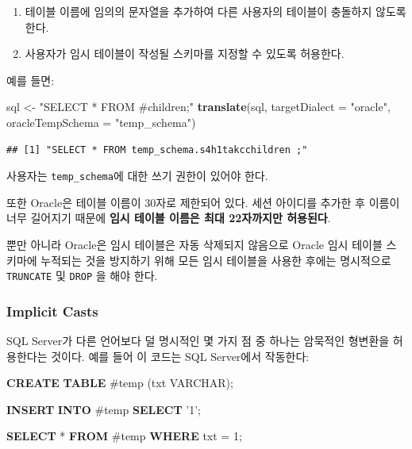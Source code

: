 \documentclass[11pt]{book}
\newenvironment{Shaded}{\begin{snugshade}}{\end{snugshade}}
\newcommand{\KeywordTok}[1]{\textcolor[rgb]{0.13,0.29,0.53}{\textbf{#1}}}
\newcommand{\DataTypeTok}[1]{\textcolor[rgb]{0.13,0.29,0.53}{#1}}
\newcommand{\DecValTok}[1]{\textcolor[rgb]{0.00,0.00,0.81}{#1}}
\newcommand{\StringTok}[1]{\textcolor[rgb]{0.31,0.60,0.02}{#1}}
\newcommand{\NormalTok}[1]{#1}
\providecommand{\tightlist}{%
  \setlength{\itemsep}{0pt}\setlength{\parskip}{0pt}}
\theoremstyle{definition}
\theoremstyle{definition}
\theoremstyle{definition}
\theoremstyle{remark}
\begin{document}
\begin{enumerate}
\def\labelenumi{\arabic{enumi}.}
\tightlist
\item
  테이블 이름에 임의의 문자열을 추가하여 다른 사용자의 테이블이 충돌하지
  않도록 한다.
\item
  사용자가 임시 테이블이 작성될 스키마를 지정할 수 있도록 허용한다.
\end{enumerate}

예를 들면:

\begin{Shaded}
\begin{Highlighting}[]
\NormalTok{sql <-}\StringTok{ "SELECT * FROM #children;"}
\KeywordTok{translate}\NormalTok{(sql, }\DataTypeTok{targetDialect =} \StringTok{"oracle"}\NormalTok{, }\DataTypeTok{oracleTempSchema =} \StringTok{"temp_schema"}\NormalTok{)}
\end{Highlighting}
\end{Shaded}

\begin{verbatim}
## [1] "SELECT * FROM temp_schema.s4h1takcchildren ;"
\end{verbatim}

사용자는 \texttt{temp\_schema}에 대한 쓰기 권한이 있어야 한다.

또한 Oracle은 테이블 이름이 30자로 제한되어 있다. 세션 아이디를 추가한
후 이름이 너무 길어지기 때문에 \textbf{임시 테이블 이름은 최대
22자까지만 허용된다}.

뿐만 아니라 Oracle은 임시 테이블은 자동 삭제되지 않음으로 Oracle 임시
테이블 스키마에 누적되는 것을 방지하기 위해 모든 임시 테이블을 사용한
후에는 명시적으로 \texttt{TRUNCATE} 및 \texttt{DROP} 을 해야 한다.

\subsubsection*{Implicit Casts}\label{implicit-casts}

SQL Server가 다른 언어보다 덜 명시적인 몇 가지 점 중 하나는 암묵적인
형변환을 허용한다는 것이다. 예를 들어 이 코드는 SQL Server에서 작동한다:

\begin{Shaded}
\begin{Highlighting}[]
\KeywordTok{CREATE} \KeywordTok{TABLE}\NormalTok{ #temp (txt }\DataTypeTok{VARCHAR}\NormalTok{);}

\KeywordTok{INSERT} \KeywordTok{INTO}\NormalTok{ #temp}
\KeywordTok{SELECT} \StringTok{'1'}\NormalTok{;}

\KeywordTok{SELECT}\NormalTok{ * }\KeywordTok{FROM}\NormalTok{ #temp }\KeywordTok{WHERE}\NormalTok{ txt = }\DecValTok{1}\NormalTok{;}
\end{Highlighting}
\end{Shaded}
\end{document}
